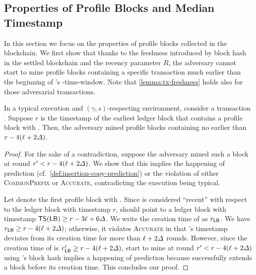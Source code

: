 \subsection{Properties of Profile Blocks and Median Timestamp}
\label{subsec:properties-profile-blocks-median-timestamp}

In this section we focus on the properties of profile blocks collected in the \Taxis blockchain.
%
We first show that thanks to the freshness introduced by block hash in the settled blockchain and the recency parameter $R$, the adversary cannot start to mine profile blocks containing a specific transaction \tx much earlier than the beginning of \tx's \PBWindowLen-time-window.
%
Note that \cref{lemma:tx-freshness} holds also for those adversarial transactions.

\begin{lemma} \label{lemma:tx-freshness}
    In a typical execution and $(\gamma, s)$-respecting environment, consider a transaction \tx.
    Suppose $r$ is the timestamp of the earliest ledger block that contains a profile block with \tx.
    Then, the adversary mined profile blocks containing \tx no earlier than $r - 4(\ell + 2\varDelta)$.
\end{lemma}

\begin{proof}
    For the sake of a contradiction, suppose the
    adversary mined such a block at round $r' < r - 4(\ell + 2\varDelta)$.
    We show that this implies the happening of prediction (cf.~\cref{def:insertion-copy-prediction}) or the violation of either \textsc{CommonPrefix} or \textsc{Accurate}, contradicting the execution being typical.

    Let \PB denote the first profile block with \tx.
    Since \PB is considered ``recent'' with respect to the ledger block with timestamp $r$, \PB should point to a ledger block \LB with timestamp $\mathsf{TS}(\mathsf{LB}) \ge r - 3\ell + 6\varDelta$.
    We write the creation time of \LB as $r_\mathsf{LB}$.
    We have $r_\mathsf{LB} \ge r - 4(\ell + 2\varDelta)$; otherwise, it violates \textsc{Accurate} in that \LB's timestamp deviates from its creation time for more than $\ell + 2\varDelta$ rounds.
    However, since the creation time of \LB is $r'_\mathsf{LB} \ge r - 4(\ell + 2\varDelta)$, \adv start to mine \PB at round $r' < r - 4(\ell + 2\varDelta)$ using \LB's block hash implies a happening of prediction because \adv successfully extends a block before its creation time.
    This concludes our proof.
\end{proof}

